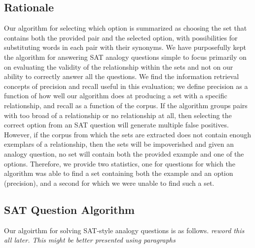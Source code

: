 \documentclass[11pt]{article}
\begin{document}
\subsection{Rationale}

Our algorithm for selecting which option is summarized as choosing the set that
contains both the provided pair and the selected option, with possibilities for
substituting words in each pair with their synonyms.  We have purposefully kept
the algorithm for answering SAT analogy questions simple to focus primarily on
on evaluating the validity of the relationship within the sets and not on our
ability to correctly answer all the questions.  We find the information
retrieval concepts of precision and recall useful in this evaluation; we define
precision as a function of how well our algorithm does at producing a set with a
specific relationship, and recall as a function of the corpus.  If the algorithm
groups pairs with too broad of a relationship or no relationship at all, then
selecting the correct option from an SAT question will generate multiple false
positives.  However, if the corpus from which the sets are extracted does not
contain enough exemplars of a relationship, then the sets will be impoverished
and given an analogy question, no set will contain both the provided example and
one of the options.  Therefore, we provide two statistics, one for questions for
which the algorithm was able to find a set containing both the example and an
option (precision), and a second for which we were unable to find such a set.


\subsection{SAT Question Algorithm}

Our algoirthm for solving SAT-style analogy questions is as
follows. \emph{reword this all later.  This might be better presented using
  paragraphs}
\end{document}
